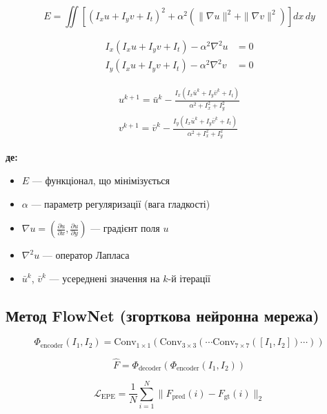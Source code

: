 \documentclass[14pt, a4paper]{extarticle}
\numberwithin{equation}{section}
\begin{document}
\begin{equation}
\boxed{E = \iint \left[(I_x u + I_y v + I_t)^2 + \alpha^2 \left( \|\nabla u\|^2 + \|\nabla v\|^2 \right) \right] dx\,dy} \tag{11}
\end{equation}

\begin{align}
I_x (I_x u + I_y v + I_t) - \alpha^2 \nabla^2 u &= 0 \tag{12} \\
I_y (I_x u + I_y v + I_t) - \alpha^2 \nabla^2 v &= 0 \tag{13}
\end{align}

\begin{align}
\boxed{u^{k+1} = \bar{u}^k - \frac{I_x (I_x \bar{u}^k + I_y \bar{v}^k + I_t)}{\alpha^2 + I_x^2 + I_y^2}} \tag{14} \\
\boxed{v^{k+1} = \bar{v}^k - \frac{I_y (I_x \bar{u}^k + I_y \bar{v}^k + I_t)}{\alpha^2 + I_x^2 + I_y^2}} \tag{15}
\end{align}

\textbf{де:}
\begin{itemize}
\item $E$ — функціонал, що мінімізується
\item $\alpha$ — параметр регуляризації (вага гладкості)
\item $\nabla u = \left(\frac{\partial u}{\partial x}, \frac{\partial u}{\partial y}\right)$ — градієнт поля $u$
\item $\nabla^2 u$ — оператор Лапласа
\item $\bar{u}^k$, $\bar{v}^k$ — усереднені значення на $k$-й ітерації
\end{itemize}

\subsection{Метод FlowNet (згорткова нейронна мережа)}

\begin{equation}
\Phi_{\text{encoder}}(I_1, I_2) = \text{Conv}_{1 \times 1}(\text{Conv}_{3 \times 3}(\cdots \text{Conv}_{7 \times 7}([I_1, I_2])\cdots)) \tag{16}
\end{equation}

\begin{equation}
\boxed{\hat{F} = \Phi_{\text{decoder}}(\Phi_{\text{encoder}}(I_1, I_2))} \tag{17}
\end{equation}

\begin{equation}
\boxed{\mathcal{L}_{\text{EPE}} = \frac{1}{N} \sum_{i=1}^N \|F_{\text{pred}}(i) - F_{\text{gt}}(i)\|_2} \tag{18}
\end{equation}
\end{document}
